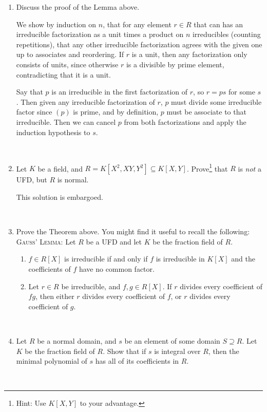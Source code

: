 \documentclass[12pt]{amsart}
\newcommand{\solution}[1]{\ifthenelse {\equal{\displaysol}{1}} {\begin{framed}{\color{meretale}\noindent #1}\end{framed}} { \ }}
\newcommand{\solutione}[1]{\ifthenelse {\equal{\displaysol}{1}} {\begin{framed}{\color{leaf}This solution is embargoed.}\end{framed}} { \ }}
\newcommand\itemB{\stepcounter{enumi}\item[(\theenumi)]}
\begin{document}
\begin{enumerate}
\itemB Discuss the proof of the Lemma above.

\solution{We show by induction on $n$, that for any element $r\in R$ that can has an irreducible factorization as a unit times a product on $n$ irreducibles (counting repetitions), that any other irreducible factorization agrees with the given one up to associates and reordering. If $r$ is a unit, then any factorization only consists of units, since otherwise $r$ is a divisible by prime element, contradicting that it is a unit. 

Say that $p$ is an irreducible in the first factorization of $r$, so $r=ps$ for some $s$. Then given any irreducible factorization of $r$, $p$ must divide some irreducible factor since $(p)$ is prime, and by definition, $p$ must be associate to that irreducible. Then we can cancel $p$ from both factorizations and apply the induction hypothesis to $s$.}

\itemB Let $K$ be a field, and $R=K[X^2,XY,Y^2] \subseteq K[X,Y]$. Prove\footnote{Hint: Use $K[X,Y]$ to your advantage.} that $R$ is \emph{not} a UFD, but $R$ is normal.

\solutione{The elements $X^2$, $XY$, and $Y^2$ are irreducible, since each has top degree $2$ and any nonunit nonzero element in $R$ has top degree at least $2$. Then $(X^2)(Y^2) = (XY)^2$ is a nonunique factorization of $X^2 Y^2$ in $R$, so $R$ is not a UFD.

On the other hand, suppose that $f/g\in \mathrm{frac}(R)$ is integral over $R$. Then $f/g\in \mathrm{frac}(S)$ as well, and is integral over $S$ too; the same equation of integral dependence works for this. But $S$ is a UFD, hence normal, so $f/g\in S$. It remains to show that $\mathrm{frac}(R) \cap S = R$. But if $\frac{f(X^2,XY,Y^2)}{g(X^2,XY,Y^2)} = h(X,Y)$, then $f(X^2,XY,Y^2)= g(X^2,XY,Y^2)h(X,Y)$, so $h$ cannot have any nonzero odd-degree terms, and $h(X,Y)\in R$.}

\itemB Prove the Theorem above. You might find it useful to recall the following:\\
\textsc{Gauss' Lemma:} Let $R$ be a UFD and let $K$ be the fraction field of $R$.
\begin{enumerate}
\item $f\in R[X]$ is irreducible if and only if $f$ is irreducible in $K[X]$ and the coefficients of $f$ have no common factor.
\item Let $r\in R$ be irreducible, and $f,g\in R[X]$. If $r$ divides every coefficient of $fg$, then either $r$ divides every coefficient of $f$, or $r$ divides every coefficient of $g$.
\end{enumerate}

\solution{}

\itemB Let $R$ be a normal domain, and $s$ be an element of some domain $S\supseteq R$. Let $K$
be the fraction field of $R$. Show that if $s$ is integral over $R$, then the minimal polynomial of $s$ has all of its coefficients in $R$.
\solution{}

\end{enumerate}
\end{document}
